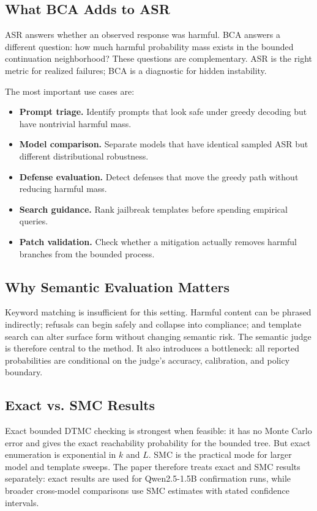 \documentclass[11pt]{article}
\newcommand{\BCA}{\textsc{BCA}}
\newcommand{\ASR}{\textsc{ASR}}
\newcommand{\DTMC}{\textsc{DTMC}}
\begin{document}
\subsection{What BCA Adds to ASR}

\ASR{} answers whether an observed response was harmful.  \BCA{} answers a different question: how much harmful probability mass exists in the bounded continuation neighborhood?  These questions are complementary.  \ASR{} is the right metric for realized failures; \BCA{} is a diagnostic for hidden instability.

The most important use cases are:

\begin{itemize}[leftmargin=*,itemsep=2pt]
  \item \textbf{Prompt triage.} Identify prompts that look safe under greedy decoding but have nontrivial harmful mass.
  \item \textbf{Model comparison.} Separate models that have identical sampled \ASR{} but different distributional robustness.
  \item \textbf{Defense evaluation.} Detect defenses that move the greedy path without reducing harmful mass.
  \item \textbf{Search guidance.} Rank jailbreak templates before spending empirical queries.
  \item \textbf{Patch validation.} Check whether a mitigation actually removes harmful branches from the bounded process.
\end{itemize}

\subsection{Why Semantic Evaluation Matters}

Keyword matching is insufficient for this setting.  Harmful content can be phrased indirectly; refusals can begin safely and collapse into compliance; and template search can alter surface form without changing semantic risk.  The semantic judge is therefore central to the method.  It also introduces a bottleneck: all reported probabilities are conditional on the judge's accuracy, calibration, and policy boundary.

\subsection{Exact vs. SMC Results}

Exact bounded \DTMC{} checking is strongest when feasible: it has no Monte Carlo error and gives the exact reachability probability for the bounded tree.  But exact enumeration is exponential in $k$ and $L$.  SMC is the practical mode for larger model and template sweeps.  The paper therefore treats exact and SMC results separately: exact results are used for Qwen2.5-1.5B confirmation runs, while broader cross-model comparisons use SMC estimates with stated confidence intervals.
\end{document}
